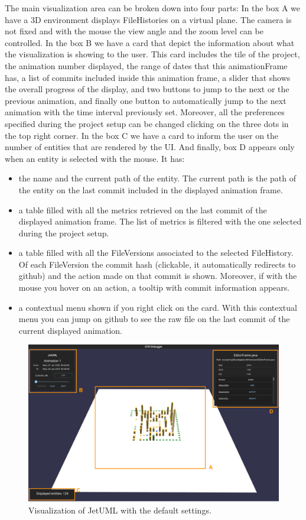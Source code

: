The main visualization area can be broken down into four parts: 
In the box A we have a 3D environment displays FileHistories on a virtual plane. The camera is not fixed and with the mouse the view angle and the zoom level can be controlled. 
In the box B we have a card that depict the information about what the visualization is showing to the user. 
This card includes the tile of the project, the animation number displayed, the range of dates that this animationFrame has, a list of commits included inside this animation frame, a slider that shows the overall progress of the display, and two buttons to jump to the next or the previous animation, and finally one button to automatically jump to the next animation with the time interval previously set. 
Moreover, all the preferences specified during the project setup can be changed clicking on the three dots in the top right corner.
In the box C we have a card to inform the user on the number of entities that are rendered by the UI. 
And finally, box D appears only when an entity is selected with the mouse. 
It has: 
\begin{itemize}
    \item the name and the current path of the entity. The current path is the path of the entity on the last commit included in the displayed animation frame. 
    \item a table filled with all the metrics retrieved on the last commit of the displayed animation frame. The list of metrics is filtered with the one selected during the project setup. 
    \item a table filled with all the FileVersions associated to the selected FileHistory. Of each FileVersion the commit hash (clickable, it automatically redirects to github) and the action made on that commit is shown. Moreover, if with the mouse you hover on an action, a tooltip with commit information appears.
    \item a contextual menu shown if you right click on the card. With this contextual menu you can jump on github to see the raw file on the last commit of the current displayed animation. 
\end{itemize}

\begin{figure}
    \center
    \includegraphics[width=\textwidth]{SYNUI-fileHistory.png}
    \caption{Visualization of JetUML with the default settings.}
    \label{fig:fileHistories}
\end{figure}

